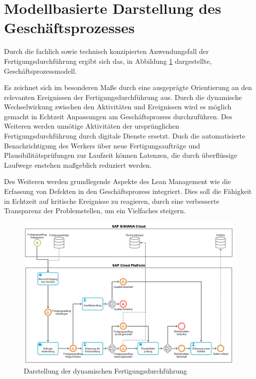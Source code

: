\section{Modellbasierte Darstellung des Geschäftsprozesses}\label{sec:bpmnabbildung}
Durch die fachlich sowie technisch konzipierten Anwendungsfall der Fertigungsdurchführung ergibt sich das, in Abbildung \ref{fig:Darstellung der dynamischen Fertigungsdurchführung} dargestellte, Geschäftsprozessmodell. 

Es zeichnet sich im besonderen Maße durch eine ausgeprägte Orientierung an den relevanten Ereignissen der Fertigungsdurchführung aus. Durch die dynamische Wechselwirkung zwischen den Aktivitäten und Ereignissen wird es möglich gemacht in Echtzeit Anpassungen am Geschäftsprozess durchzuführen. Des Weiteren werden unnötige Aktivitäten der ursprünglichen Fertigungsdurchführung durch digitale Dienste ersetzt. Duch die automatisierte Benachrichtigung des Werkers  über neue Fertigungsaufträge und Plausibilitätsprüfungen zur Laufzeit können Latenzen, die durch überflüssige Laufwege enstehen maßgeblich reduziert werden.

Des Weiteren werden grundlegende Aspekte des Lean Management wie die Erfassung von Defekten in den Geschäftsprozess integriert. Dies soll die Fähigkeit in Echtzeit auf kritische Ereignisse zu reagieren, durch eine verbesserte Transparenz der Problemstellen, um ein Vielfaches steigern.

\begin{figure}[H]
	\centering 
	\includegraphics[width=1.4\textwidth, angle =90 ]{img/gesamt.png}
	\caption[Darstellung der dynamischen Fertigungsdurchführung]{\label{fig:Darstellung der dynamischen Fertigungsdurchführung}Darstellung der dynamischen Fertigungsdurchführung
	}
\end{figure}